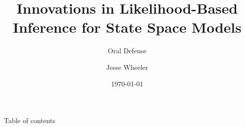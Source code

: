 \documentclass[aspectratio=169, 10pt]{beamer}
\title[]{Innovations in Likelihood-Based Inference for State Space Models}
\subtitle{Oral Defense}
\date[]{\today}
\author[Wheeler]{Jesse Wheeler}
\institute{Department of Statistics, University of Michigan}
\newcommand{\themename}{\textbf{\textsc{Gotham}}}
\begin{document}
\maketitle

	\begin{frame}[toc]{Table of contents}%
		\tableofcontents%
	\end{frame}

	
% 











% 


% 
% 
% 
% 




\end{document}
